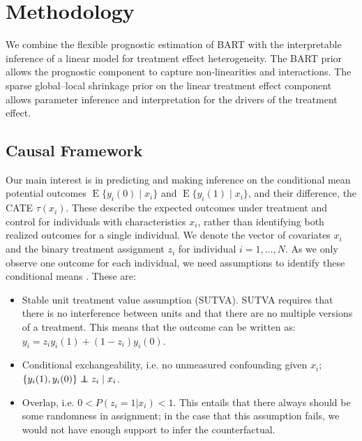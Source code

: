 \documentclass[12pt]{article}
\newcommand\independent{\protect\mathpalette{\protect\independenT}{\perp}}
\def\independenT#1#2{\mathrel{\rlap{$#1#2$}\mkern2mu{#1#2}}}
\begin{document}
\section{Methodology}
\label{sec:method}
We combine the flexible prognostic estimation of BART with the interpretable inference of a linear model for treatment effect heterogeneity. The BART prior allows the prognostic component to capture non-linearities and interactions. The sparse global--local shrinkage prior on the linear treatment effect component allows parameter inference and interpretation for the drivers of the treatment effect.

\subsection{Causal Framework}
Our main interest is in predicting and making inference on the conditional mean potential outcomes $\operatorname{E}\{y_i(0)\mid x_i\}$ and $\operatorname{E}\{y_i(1)\mid x_i\}$, and their difference, the CATE $\tau(x_i)$. These describe the expected outcomes under treatment and control for individuals with characteristics $x_i$, rather than identifying both realized outcomes for a single individual. We denote the vector of covariates $x_i$ and the binary treatment assignment $z_i$ for individual $i=1,\ldots,N$. As we only observe one outcome for each individual, we need assumptions to identify these conditional means \citep{imbens2015causal}. These are:
\begin{itemize}
    \item Stable unit treatment value assumption (SUTVA). SUTVA requires that there is no interference between units and that there are no multiple versions of a treatment. This means that the outcome can be written as: $y_i = z_iy_i(1) + (1-z_i)y_i(0)$.
    \item Conditional exchangeability, i.e. no unmeasured confounding given $x_i$; $\{y_i(1),y_i(0)\} \independent z_i \mid x_i$.
    \item Overlap, i.e. $ 0 < P(z_i = 1 | x_i) < 1$. This entails that there always should be some randomness in assignment; in the case that this assumption fails, we would not have enough support to infer the counterfactual.
\end{itemize}
\end{document}

